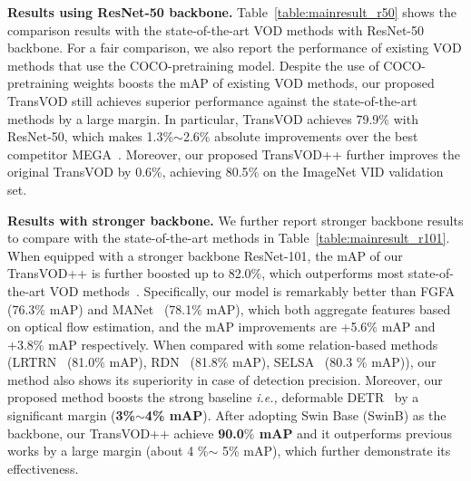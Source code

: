 \documentclass[10pt,journal,compsoc]{IEEEtran}
\begin{document}
\noindent
\textbf{Results using ResNet-50 backbone.}
Table~\ref{table:mainresult_r50} shows the comparison results with the state-of-the-art VOD methods with ResNet-50 backbone.
For a fair comparison, we also report the performance of existing VOD methods that use the COCO-pretraining model.
Despite the use of COCO-pretraining weights boosts the mAP of existing VOD methods, our proposed TransVOD still achieves superior performance against the state-of-the-art methods by a large margin. 
In particular, TransVOD achieves 79.9$\%$ with ResNet-50, which makes 1.3\%$\sim$2.6$\%$ absolute improvements over the best competitor MEGA~\cite{chen2020memory}. Moreover, our proposed TransVOD++ further improves the original TransVOD by 0.6$\%$, achieving 80.5$\%$ on the ImageNet VID validation set.


\noindent
\textbf{Results with stronger backbone.} We further report stronger backbone results to compare with the state-of-the-art methods in Table~\ref{table:mainresult_r101}. When equipped with a stronger backbone ResNet-101, the mAP of our TransVOD++ is further boosted up to 82.0\%, which outperforms most state-of-the-art VOD methods~\cite{zhu17dff,feichtenhofer17dt,zhu17fgfa,wang18manet,zhu18hp}. Specifically, our model is remarkably better than FGFA~\cite{zhu17fgfa} (76.3$\%$ mAP) and MANet~\cite{wang18manet} (78.1$\%$ mAP), which both aggregate features based on optical flow estimation, and the mAP improvements are +5.6$\%$ mAP and +3.8$\%$ mAP respectively. When compared with some relation-based methods
(LRTRN~\cite{shvets19lltr} (81.0$\%$ mAP), RDN~\cite{deng19rdn} (81.8$\%$ mAP), SELSA~\cite{wu19selsa}  (80.3 $\%$ mAP)), our method also shows its superiority in case of detection precision.
Moreover, our proposed method boosts the strong baseline \emph{i.e.,} deformable DETR~\cite{zhu2020deformable} by a significant margin (\textbf{3\%$\sim$4\% mAP}). After adopting Swin Base (SwinB) as the backbone, our TransVOD++ achieve \textbf{90.0$\%$ mAP} and it outperforms previous works by a large margin (about 4 \%$\sim$ 5\% mAP), which further demonstrate its effectiveness. 
\end{document}
